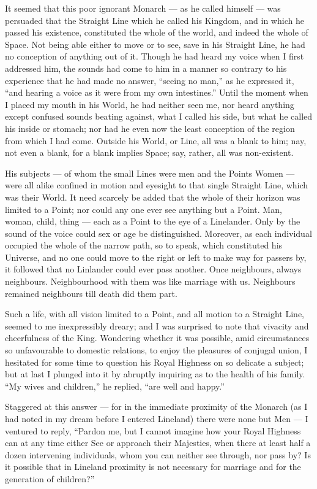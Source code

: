 \documentclass[12pt, a4paper, twoside]{memoir}
\begin{document}
It seemed that this poor ignorant Monarch --- as he called himself --- was
persuaded that the Straight Line which he called his Kingdom, and in which he
passed his existence, constituted the whole of the world, and indeed the whole
of Space. Not being able either to move or to see, save in his Straight Line,
he had no conception of anything out of it. Though he had heard my voice when
I first addressed him, the sounds had come to him in a manner so contrary to
his experience that he had made no answer, ``seeing no man,'' as he expressed
it, ``and hearing a voice as it were from my own intestines.'' Until the moment
when I placed my mouth in his World, he had neither seen me, nor heard
anything except confused sounds beating against, what I called his side, but
what he called his inside or stomach; nor had he even now the least conception
of the region from which I had come. Outside his World, or Line, all was a
blank to him; nay, not even a blank, for a blank implies Space; say, rather,
all was non-existent.

His subjects --- of whom the small Lines were men and the Points Women --- were
all alike confined in motion and eyesight to that single Straight Line, which
was their World. It need scarcely be added that the whole of their horizon was
limited to a Point; nor could any one ever see anything but a Point. Man,
woman, child, thing --- each as a Point to the eye of a Linelander. Only by the
sound of the voice could sex or age be distinguished. Moreover, as each
individual occupied the whole of the narrow path, so to speak, which
constituted his Universe, and no one could move to the right or left to make
way for passers by, it followed that no Linlander could ever pass another.
Once neighbours, always neighbours. Neighbourhood with them was like marriage
with us. Neighbours remained neighbours till death did them part.

Such a life, with all vision limited to a Point, and all motion to a Straight
Line, seemed to me inexpressibly dreary; and I was surprised to note that
vivacity and cheerfulness of the King. Wondering whether it was possible, amid
circumstances so unfavourable to domestic relations, to enjoy the pleasures of
conjugal union, I hesitated for some time to question his Royal Highness on so
delicate a subject; but at last I plunged into it by abruptly inquiring as to
the health of his family. ``My wives and children,'' he replied, ``are well and
happy.''

Staggered at this answer --- for in the immediate proximity of the Monarch (as I
had noted in my dream before I entered Lineland) there were none but Men --- I
ventured to reply, ``Pardon me, but I cannot imagine how your Royal Highness
can at any time either See or approach their Majesties, when there at least
half a dozen intervening individuals, whom you can neither see through, nor
pass by? Is it possible that in Lineland proximity is not necessary for
marriage and for the generation of children?''
\end{document}
